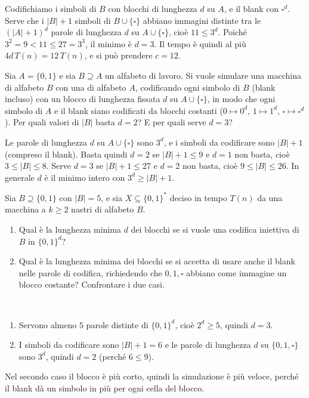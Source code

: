 \begin{sol}
Codifichiamo i simboli di $B$ con blocchi di lunghezza $d$ su $A$, e il blank con $\square^d$. Serve che i $|B|+1$ simboli di $B\cup\{\square\}$ abbiano immagini distinte tra le $(|A|+1)^d$ parole di lunghezza $d$ su $A\cup\{\square\}$, cioè $11\leq 3^d$. Poiché $3^2=9<11\leq 27=3^3$, il minimo è $d=3$. Il tempo è quindi al più $4d\,T(n)=12\,T(n)$, e si può prendere $c=12$.
\end{sol}

\newpage

\begin{ex}
Sia $A=\{0,1\}$ e sia $B\supseteq A$ un alfabeto di lavoro. Si vuole simulare una macchina di alfabeto $B$ con una di alfabeto $A$, codificando ogni simbolo di $B$ (blank incluso) con un blocco di lunghezza fissata $d$ su $A\cup\{\square\}$, in modo che ogni simbolo di $A$ e il blank siano codificati da blocchi costanti ($0\mapsto 0^d$, $1\mapsto 1^d$, $\square\mapsto\square^d$). Per quali valori di $|B|$ basta $d=2$? E per quali serve $d=3$?
\end{ex}

\begin{sol}
Le parole di lunghezza $d$ su $A\cup\{\square\}$ sono $3^d$, e i simboli da codificare sono $|B|+1$ (compreso il blank). Basta quindi $d=2$ se $|B|+1\leq 9$ e $d=1$ non basta, cioè $3\leq|B|\leq 8$. Serve $d=3$ se $|B|+1\leq 27$ e $d=2$ non basta, cioè $9\leq|B|\leq 26$. In generale $d$ è il minimo intero con $3^d\geq|B|+1$.
\end{sol}

\newpage

\begin{ex}
Sia $B\supseteq\{0,1\}$ con $|B|=5$, e sia $X\subseteq\{0,1\}^*$ deciso in tempo $T(n)$ da una macchina a $k\geq 2$ nastri di alfabeto $B$.
\begin{enumerate}
  \item Qual è la lunghezza minima $d$ dei blocchi se si vuole una codifica iniettiva di $B$ in $\{0,1\}^d$?
  \item Qual è la lunghezza minima dei blocchi se si accetta di usare anche il blank nelle parole di codifica, richiedendo che $0,1,\square$ abbiano come immagine un blocco costante? Confrontare i due casi.
\end{enumerate}
\end{ex}

\begin{sol}\
\begin{enumerate}
  \item Servono almeno $5$ parole distinte di $\{0,1\}^d$, cioè $2^d\geq 5$, quindi $d=3$.
  \item I simboli da codificare sono $|B|+1=6$ e le parole di lunghezza $d$ su $\{0,1,\square\}$ sono $3^d$, quindi $d=2$ (perché $6\leq 9$).
\end{enumerate}
Nel secondo caso il blocco è più corto, quindi la simulazione è più veloce, perché il blank dà un simbolo in più per ogni cella del blocco.
\end{sol}

